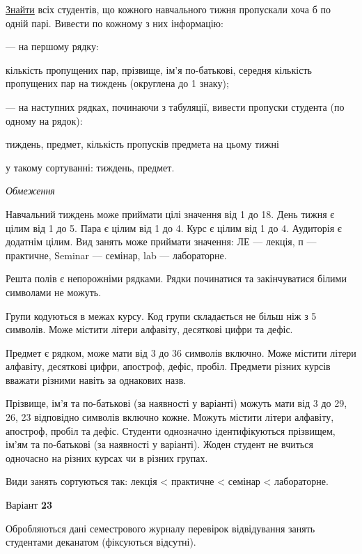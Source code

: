 \documentclass[11pt, ukrainian]{article}
\begin{document}
\underline{Знайти} всіх студентів, що кожного навчального тижня пропускали хоча б по одній парі. Вивести по кожному з них інформацію:\par
{\noindent}--- на першому рядку:\par
кількість пропущених пар, прізвище, ім’я по-батькові, середня кількість пропущених пар на тиждень (округлена до 1 знаку);

{\noindent}--- на наступних рядках, починаючи з табуляції, вивести пропуски студента (по одному на рядок):\par
тиждень, предмет, кількість пропусків предмета на цьому тижні

{\noindent}у такому сортуванні: тиждень, предмет.


\bigskip\textit{Обмеження}

Навчальний тиждень може приймати цілі значення від 1 до 18.
День тижня є цілим від 1 до 5. Пара є цілим від 1 до 4.
Курс є цілим від 1 до 4. Аудиторія є додатнім цілим.
Вид занять може приймати значення:
ЛЕ --- лекція, п --- практичне, Seminar --- семінар, lab --- лабораторне.

Решта полів є непорожніми рядками.
Рядки починатися та закінчуватися білими символами не можуть.

Групи кодуються в межах курсу.
Код групи складається не більш ніж з 5 символів.
Може містити літери алфавіту, десяткові цифри та дефіс.

Предмет є рядком, може мати від 3 до 36 символів включно.
Може містити літери алфавіту, десяткові цифри, апостроф, дефіс, пробіл.
Предмети різних курсів вважати різними навіть за однакових назв.

Прізвище, ім’я та по-батькові (за наявності у варіанті)
можуть мати від 3 до 29, 26, 23 відповідно символів включно кожне.
Можуть містити літери алфавіту, апостроф, пробіл та дефіс.
Студенти однозначно ідентифікуються прізвищем, ім’ям та по-батькові (за наявності у варіанті).
Жоден студент не вчиться одночасно на різних курсах чи в різних групах.

Види занять сортуються так: лекція < практичне < семінар < лабораторне.



\par
\newpage
{\center Варіант  \No \textbf { 23 }\par}
\bigskip
Обробляються дані семестрового журналу перевірок відвідування занять студентами деканатом (фіксуються відсутні). 
\end{document}
